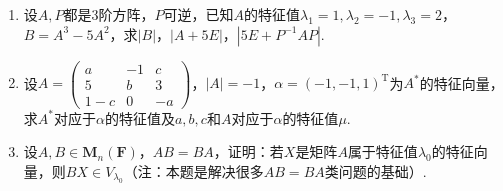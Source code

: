 \begin{enumerate}
    \item 设$A,P$都是3阶方阵，$P$可逆，已知$A$的特征值$\lambda_1=1,\lambda_2=-1,\lambda_3=2$，$B=A^3-5A^2$，求$|B|$，$|A+5E|$，$|5E+P^{-1}AP|$.

    \item 设$A=\begin{pmatrix}
                  a & -1 & c \\ 5 & b & 3 \\ 1-c & 0 & -a
              \end{pmatrix}$，$|A|=-1$，$\alpha=(-1,-1,1)^\mathrm{T}$为$A^*$的特征向量，求$A^*$对应于$\alpha$的特征值及$a,b,c$和$A$对应于$\alpha$的特征值$\mu$.

    \item 设$A,B\in \mathbf{M}_n(\mathbf{F})$，$AB=BA$，证明：若$X$是矩阵$A$属于特征值$\lambda_0$的特征向量，则$BX\in V_{\lambda_0}$（注：本题是解决很多$AB=BA$类问题的基础）.
\end{enumerate}

